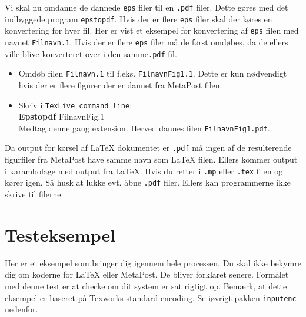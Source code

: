 \documentclass{article}
\begin{document}
Vi skal nu omdanne de dannede \verb"eps" filer til en \verb".pdf" filer. Dette gøres med det indbyggede program \verb"epstopdf".
Hvis der er flere \verb"eps" filer skal der køres en konvertering for hver fil. Her er vist et eksempel for konvertering af \verb"eps" filen med navnet \verb"Filnavn.1".
Hvis der er flere \verb"eps" filer må de først omdøbes, da de ellers ville blive konverteret over i den samme\verb".pdf" fil.
\begin{itemize}
\item Omdøb filen \verb"Filnavn.1" til f.eks. \verb"FilnavnFig1.1". Dette er kun nødvendigt hvis der er flere figurer der er dannet fra MetaPost filen.
\item Skriv i \verb"TexLive command line":\\
\textbf{Epstopdf} FilnavnFig.1\\
Medtag denne gang extension. Herved dannes filen \verb"FilnavnFig1.pdf". 
\end{itemize}
Da output for kørsel af \LaTeX{} dokumentet er \verb".pdf" må ingen af de resulterende figurfiler fra MetaPost have samme navn som \LaTeX{} filen. Ellers kommer output i karambolage med output fra \LaTeX{}.
Hvis du retter i \verb".mp" eller \verb".tex" filen og kører igen. Så husk at lukke evt. åbne \verb".pdf" filer. Ellers kan programmerne ikke skrive til filerne.

\section{Testeksempel}

Her er et eksempel som bringer dig igennem hele processen. Du skal ikke bekymre dig om koderne for \LaTeX{} eller MetaPost. De bliver forklaret senere. Formålet med denne test er at checke om dit system er sat rigtigt op. Bemærk, at dette eksempel er baseret på Texworks standard encoding. Se iøvrigt pakken \verb"inputenc" nedenfor. 
\end{document}
